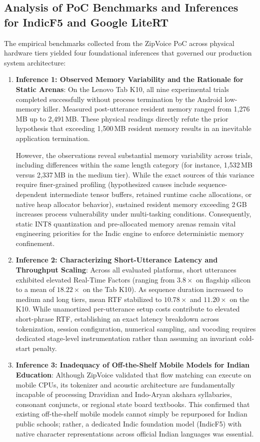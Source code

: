 \subsection{Analysis of PoC Benchmarks and Inferences for IndicF5 and Google LiteRT}
The empirical benchmarks collected from the ZipVoice PoC across physical hardware tiers yielded four foundational inferences that governed our production system architecture:
\begin{enumerate}
    \item \textbf{Inference 1: Observed Memory Variability and the Rationale for Static Arenas}:
    On the Lenovo Tab K10, all nine experimental trials completed successfully without process termination by the Android low-memory killer. Measured post-utterance resident memory ranged from 1,276\,MB up to 2,491\,MB. These physical readings directly refute the prior hypothesis that exceeding 1,500\,MB resident memory results in an inevitable application termination. 
    
    However, the observations reveal substantial memory variability across trials, including differences within the same length category (for instance, 1,532\,MB versus 2,337\,MB in the medium tier). While the exact sources of this variance require finer-grained profiling (hypothesized causes include sequence-dependent intermediate tensor buffers, retained runtime cache allocations, or native heap allocator behavior), sustained resident memory exceeding 2\,GB increases process vulnerability under multi-tasking conditions. Consequently, static INT8 quantization and pre-allocated memory arenas remain vital engineering priorities for the Indic engine to enforce deterministic memory confinement.
    
    \item \textbf{Inference 2: Characterizing Short-Utterance Latency and Throughput Scaling}:
    Across all evaluated platforms, short utterances exhibited elevated Real-Time Factors (ranging from $3.8\times$ on flagship silicon to a mean of $18.22\times$ on the Tab K10). As sequence duration increased to medium and long tiers, mean RTF stabilized to $10.78\times$ and $11.20\times$ on the K10. While unamortized per-utterance setup costs contribute to elevated short-phrase RTF, establishing an exact latency breakdown across tokenization, session configuration, numerical sampling, and vocoding requires dedicated stage-level instrumentation rather than assuming an invariant cold-start penalty.
    
    \item \textbf{Inference 3: Inadequacy of Off-the-Shelf Mobile Models for Indian Education}:
    Although ZipVoice validated that flow matching can execute on mobile CPUs, its tokenizer and acoustic architecture are fundamentally incapable of processing Dravidian and Indo-Aryan akshara syllabaries, consonant conjuncts, or regional state board textbooks. This confirmed that existing off-the-shelf mobile models cannot simply be repurposed for Indian public schools; rather, a dedicated Indic foundation model (IndicF5) with native character representations across official Indian languages was essential.
    

\end{enumerate}
